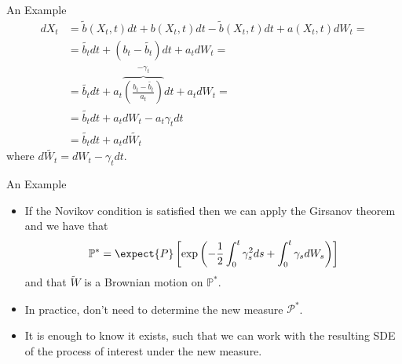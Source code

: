 \documentclass{beamer}
\begin{document}
\begin{frame}{An Example}
  \begin{equation*}
    \begin{aligned}
      dX_t &= \tilde{b}(X_t,t) dt+b(X_t,t) dt -\tilde{b}(X_t,t) dt + a(X_t,t) dW_t = \\
      &=\tilde{b_t} dt + (b_t -\tilde{b_t})dt + a_t dW_t =\\
      &=\tilde{b_t}dt+ a_t\overbrace{\left(\frac{b_t-\tilde{b_t}}{a_t}\right)}^{-\gamma_t}dt + a_t dW_t = \\
      &= \tilde{b_t}dt+a_t dW_t - a_t\gamma_t dt\\
      &=\tilde{b_t}dt+a_t d\tilde{W_t}
    \end{aligned}
  \end{equation*}
  where $d\tilde{W_t}=dW_t-\gamma_t dt$.
\end{frame}

\begin{frame}{An Example}
  \begin{itemize}
  \item<1-> If the Novikov condition is satisfied then we can apply the Girsanov theorem and we have that
    \begin{equation}
      \mathbb{P}^* = \expect{P}\left[\exp\left(-\frac{1}{2}\int_0^t \gamma_s^2 ds + \int_0^t \gamma_s dW_s \right)\right]
    \end{equation}
    and that $\tilde{W}$ is a Brownian motion on $\mathbb{P}^*$.
  \item<2-> In practice, don't need to determine the new measure $\mathcal{P}^*$.
  \item<3-> It is enough to know it exists, such that we can work with the resulting SDE of the process of interest under the new measure.	
  \end{itemize}
\end{frame}
\end{document}
